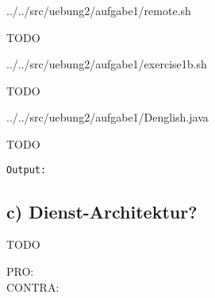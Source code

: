 
	{../../src/uebung2/aufgabe1/remote.sh}

{\sf TODO}


	{../../src/uebung2/aufgabe1/exercise1b.sh}

{\sf TODO}


	{../../src/uebung2/aufgabe1/Denglish.java}

{\sf TODO}

\begin{verbatim}
Output:
\end{verbatim}

	
\subsection*{c) Dienst-Architektur?}
{\sf TODO}

\begin{description}
\item[PRO:]
\item[CONTRA:]
\end{description}
